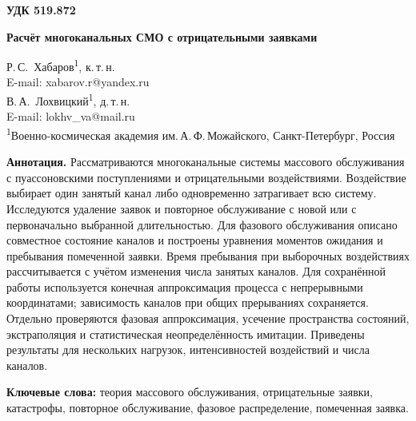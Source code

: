 

\noindent\textbf{УДК 519.872}
\vspace{1em}

\begin{center}
{\Large\bfseries Расчёт многоканальных СМО с отрицательными заявками}
\end{center}
\vspace{0.8em}

\begin{center}
Р.\,С.~Хабаров\textsuperscript{1}, к.\,т.\,н.\\[2pt]
E-mail: xabarov.r@yandex.ru\\[6pt]
В.\,А.~Лохвицкий\textsuperscript{1}, д.\,т.\,н.\\[2pt]
E-mail: lokhv\_va@mail.ru\\[8pt]
{\small\textsuperscript{1}Военно-космическая академия им.\,А.\,Ф.\,Можайского, Санкт-Петербург, Россия}
\end{center}
\vspace{0.5em}

\noindent\textbf{Аннотация.} 
Рассматриваются многоканальные системы массового обслуживания с пуассоновскими поступлениями и отрицательными воздействиями. Воздействие выбирает один занятый канал либо одновременно затрагивает всю систему. Исследуются удаление заявок и повторное обслуживание с новой или с первоначально выбранной длительностью. Для фазового обслуживания описано совместное состояние каналов и построены уравнения моментов ожидания и пребывания помеченной заявки. Время пребывания при выборочных воздействиях рассчитывается с учётом изменения числа занятых каналов. Для сохранённой работы используется конечная аппроксимация процесса с непрерывными координатами; зависимость каналов при общих прерываниях сохраняется. Отдельно проверяются фазовая аппроксимация, усечение пространства состояний, экстраполяция и статистическая неопределённость имитации. Приведены результаты для нескольких нагрузок, интенсивностей воздействий и числа каналов.

\textbf{Ключевые слова:} теория массового обслуживания, отрицательные заявки, катастрофы, повторное обслуживание, фазовое распределение, помеченная заявка.

